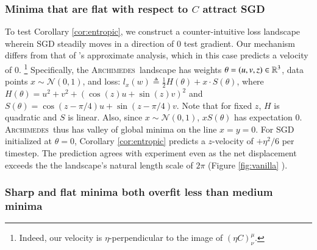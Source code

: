 \documentclass{article}
\newcommand{\ofsix}[1]{
    {\tiny \raisebox{0.04cm}{$\substack{
        \ifthenelse{\equal{#1}{0}}{{\color{moor}\blacksquare}}{\square}
        \ifthenelse{\equal{#1}{2}}{{\color{moor}\blacksquare}}{\square}    
        \ifthenelse{\equal{#1}{4}}{{\color{moor}\blacksquare}}{\square} \\
        \ifthenelse{\equal{#1}{1}}{{\color{moor}\blacksquare}}{\square}    
        \ifthenelse{\equal{#1}{3}}{{\color{moor}\blacksquare}}{\square}
        \ifthenelse{\equal{#1}{5}}{{\color{moor}\blacksquare}}{\square}
    }$}}
}
\theoremstyle{plain}
\theoremstyle{definition}
\newcommand{\Nn}{\mathcal{N}}   \newcommand{\NN}{\mathbb{N}}
\newcommand{\Archimedes}{\textsc{Archimedes}}
\begin{document}

    \subsubsection{Minima that are flat with respect to $C$ attract SGD} \label{subsect:entropic}
        To test Corollary \ref{cor:entropic}, we construct a counter-intuitive
        loss landscape wherein SGD steadily moves in a direction of $0$ test
        gradient.  Our mechanism differs from that of \cite{ch18}'s approximate
        analysis, which in this case predicts a velocity of $0$.%
        \footnote{
            Indeed, our velocity is $\eta$-perpendicular to the image of
            $(\eta C)^\mu_\nu$.
        }
        Specifically, the \Archimedes\ landscape has
        weights     $\theta = (u,v,z) \in \mathbb{R}^3$,
        data points $x \sim \Nn(0, 1)$,
        and loss:
        $
            l_x(w)
            \triangleq
            \frac{1}{2} H(\theta) + x \cdot S(\theta)
        $,
        where $H(\theta) = u^2 + v^2 + (\cos(z) u + \sin(z) v)^2$
        and   $S(\theta) = \cos(z-\pi/4) u + \sin(z-\pi/4) v$.
        Note that for fixed $z$, $H$ is quadratic and $S$ is linear.  Also,
        since $x \sim \Nn(0,1)$, $x S(\theta)$ has expectation $0$.
        \Archimedes\ thus has valley of global minima on the line $x=y=0$. 
        For SGD initialized at $\theta=0$, Corollary \ref{cor:entropic}
        predicts a $z$-velocity of $+\eta^2/6$ per timestep.  The prediction
        agrees with experiment even as the net displacement exceeds the 
        the landscape's natural length scale of $2\pi$
        (Figure \ref{fig:vanilla}\ofsix{4}).


    \subsubsection{Sharp and flat minima both overfit less than medium minima} \label{subsect:overfit}
\end{document}
